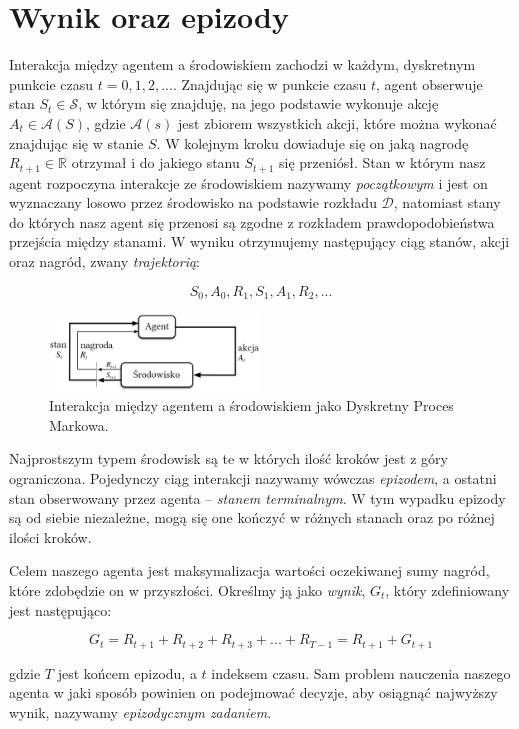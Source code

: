 \documentclass[licencjacka]{pracamgr}
\begin{document}
\section{Wynik oraz epizody}

Interakcja między agentem a środowiskiem zachodzi w każdym, dyskretnym punkcie czasu $ t = 0, 1, 2, ... $. Znajdując się w punkcie czasu $t$, agent obserwuje stan $ S_t \in \mathcal{S} $, w którym się znajduję, na jego podstawie wykonuje akcję $ A_t \in \mathcal{A}(S) $, gdzie $ \mathcal{A}(s) $ jest zbiorem wszystkich akcji, które można wykonać znajdując się w stanie $S$. W kolejnym kroku dowiaduje się on jaką nagrodę $ R_{t+1} \in \mathbb{R} $ otrzymał i do jakiego stanu $ S_{t+1} $ się przeniósł. Stan w którym nasz agent rozpoczyna interakcje ze środowiskiem nazywamy \emph{początkowym} i jest on wyznaczany losowo przez środowisko na podstawie rozkładu $\mathcal{D}$, natomiast stany do których nasz agent się przenosi są zgodne z rozkładem prawdopodobieństwa przejścia między stanami. W wyniku otrzymujemy następujący ciąg stanów, akcji oraz nagród, zwany \emph{trajektorią}:

$$ S_0, A_0, R_1, S_1, A_1, R_2, ... $$


\begin{figure}[ht]
  \centering
  \includegraphics[width=0.5\textwidth]{agent_env_interaction}
  \caption{Interakcja między agentem a środowiskiem jako Dyskretny Proces Markowa. \cite{Sutton}}
\end{figure}

Najprostszym typem środowisk są te w których ilość kroków jest z góry ograniczona. Pojedynczy ciąg interakcji nazywamy wówczas \emph{epizodem}, a ostatni stan obserwowany przez agenta -- \emph{stanem terminalnym}. W tym wypadku epizody są od siebie niezależne, mogą się one kończyć w różnych stanach oraz po różnej ilości kroków. 

Celem naszego agenta jest maksymalizacja wartości oczekiwanej sumy nagród, które zdobędzie on w przyszłości. Określmy ją jako \emph{wynik}, $ G_t $, który zdefiniowany jest następująco:

$$ G_t = R_{t+1} + R_{t+2} + R_{t+3} + ... + R_{T-1} = R_{t+1} + G_{t+1} $$

gdzie $T$ jest końcem epizodu, a $t$ indeksem czasu. Sam problem nauczenia naszego agenta w jaki sposób powinien on podejmować decyzje, aby osiągnąć najwyższy wynik, nazywamy \emph{epizodycznym zadaniem}.
\end{document}
